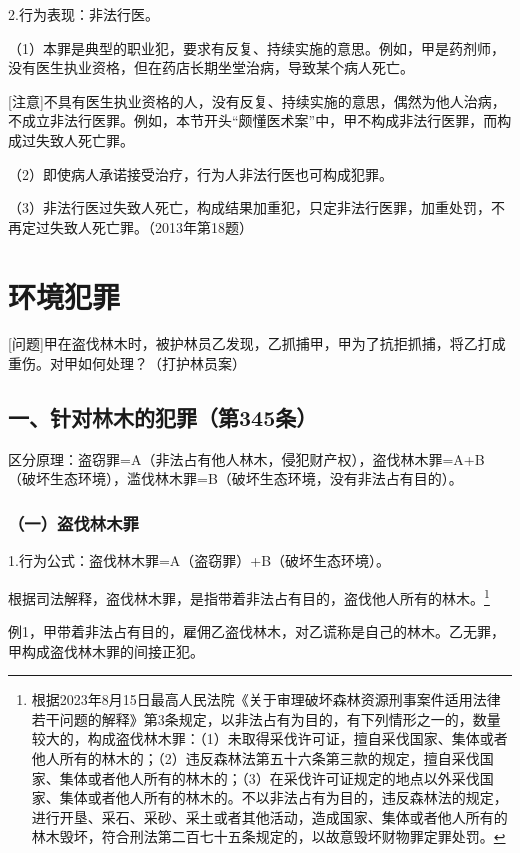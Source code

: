 2.行为表现：非法行医。

（1）本罪是典型的职业犯，要求有反复、持续实施的意思。例如，甲是药剂师，没有医生执业资格，但在药店长期坐堂治病，导致某个病人死亡。

[注意]不具有医生执业资格的人，没有反复、持续实施的意思，偶然为他人治病，不成立非法行医罪。例如，本节开头“颇懂医术案”中，甲不构成非法行医罪，而构成过失致人死亡罪。

（2）即使病人承诺接受治疗，行为人非法行医也可构成犯罪。

（3）非法行医过失致人死亡，构成结果加重犯，只定非法行医罪，加重处罚，不再定过失致人死亡罪。（2013年第18题）

\section{环境犯罪}

[问题]甲在盗伐林木时，被护林员乙发现，乙抓捕甲，甲为了抗拒抓捕，将乙打成重伤。对甲如何处理？（打护林员案）

\subsection*{一、针对林木的犯罪（第345条）}

区分原理：盗窃罪=A（非法占有他人林木，侵犯财产权），盗伐林木罪=A+B（破坏生态环境），滥伐林木罪=B（破坏生态环境，没有非法占有目的）。

\subsubsection*{（一）盗伐林木罪}

1.行为公式：盗伐林木罪=A（盗窃罪）+B（破坏生态环境）。

根据司法解释，盗伐林木罪，是指带着非法占有目的，盗伐他人所有的林木。\footnote{根据2023年8月15日最高人民法院《关于审理破坏森林资源刑事案件适用法律若干问题的解释》第3条规定，以非法占有为目的，有下列情形之一的，数量较大的，构成盗伐林木罪：（1）未取得采伐许可证，擅自采伐国家、集体或者他人所有的林木的；（2）违反森林法第五十六条第三款的规定，擅自采伐国家、集体或者他人所有的林木的；（3）在采伐许可证规定的地点以外采伐国家、集体或者他人所有的林木的。不以非法占有为目的，违反森林法的规定，进行开垦、采石、采砂、采土或者其他活动，造成国家、集体或者他人所有的林木毁坏，符合刑法第二百七十五条规定的，以故意毁坏财物罪定罪处罚。}

例1，甲带着非法占有目的，雇佣乙盗伐林木，对乙谎称是自己的林木。乙无罪，甲构成盗伐林木罪的间接正犯。

